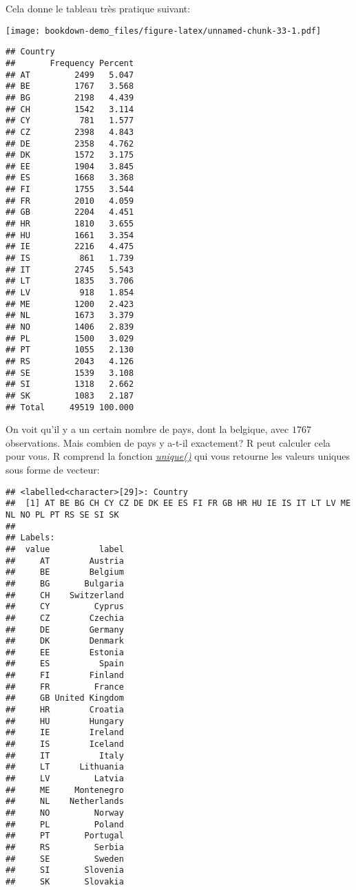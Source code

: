 \documentclass[
]{book}
\newenvironment{Shaded}{\begin{snugshade}}{\end{snugshade}}
\newcommand{\FunctionTok}[1]{\textcolor[rgb]{0.00,0.00,0.00}{#1}}
\newcommand{\NormalTok}[1]{#1}
\newcommand{\SpecialCharTok}[1]{\textcolor[rgb]{0.00,0.00,0.00}{#1}}
\begin{document}
\begin{Shaded}
\end{Shaded}

Cela donne le tableau très pratique suivant:

\texttt{[image: bookdown-demo\_files/figure-latex/unnamed-chunk-33-1.pdf]}

\begin{verbatim}
## Country 
##       Frequency Percent
## AT         2499   5.047
## BE         1767   3.568
## BG         2198   4.439
## CH         1542   3.114
## CY          781   1.577
## CZ         2398   4.843
## DE         2358   4.762
## DK         1572   3.175
## EE         1904   3.845
## ES         1668   3.368
## FI         1755   3.544
## FR         2010   4.059
## GB         2204   4.451
## HR         1810   3.655
## HU         1661   3.354
## IE         2216   4.475
## IS          861   1.739
## IT         2745   5.543
## LT         1835   3.706
## LV          918   1.854
## ME         1200   2.423
## NL         1673   3.379
## NO         1406   2.839
## PL         1500   3.029
## PT         1055   2.130
## RS         2043   4.126
## SE         1539   3.108
## SI         1318   2.662
## SK         1083   2.187
## Total     49519 100.000
\end{verbatim}

On voit qu'il y a un certain nombre de pays, dont la belgique, avec \(1767\) observations. Mais combien de pays y a-t-il exactement? R peut calculer cela pour vous. R comprend la fonction \href{https://www.rdocumentation.org/packages/base/versions/3.6.2/topics/unique}{\emph{unique()}} qui vous retourne les valeurs uniques sous forme de vecteur:

\begin{Shaded}
\end{Shaded}

\begin{verbatim}
## <labelled<character>[29]>: Country
##  [1] AT BE BG CH CY CZ DE DK EE ES FI FR GB HR HU IE IS IT LT LV ME NL NO PL PT RS SE SI SK
## 
## Labels:
##  value          label
##     AT        Austria
##     BE        Belgium
##     BG       Bulgaria
##     CH    Switzerland
##     CY         Cyprus
##     CZ        Czechia
##     DE        Germany
##     DK        Denmark
##     EE        Estonia
##     ES          Spain
##     FI        Finland
##     FR         France
##     GB United Kingdom
##     HR        Croatia
##     HU        Hungary
##     IE        Ireland
##     IS        Iceland
##     IT          Italy
##     LT      Lithuania
##     LV         Latvia
##     ME     Montenegro
##     NL    Netherlands
##     NO         Norway
##     PL         Poland
##     PT       Portugal
##     RS         Serbia
##     SE         Sweden
##     SI       Slovenia
##     SK       Slovakia
\end{verbatim}
\end{document}
